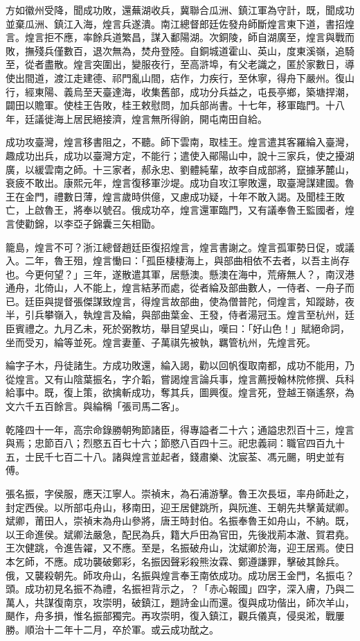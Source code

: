 \begin{pinyinscope}
方如徽州受降，聞成功敗，還蕪湖收兵，冀聯合瓜洲、鎮江軍為守計，既，聞成功並棄瓜洲、鎮江入海，煌言兵遂潰。南江總督郎廷佐發舟師斷煌言東下道，書招煌言。煌言拒不應，率餘兵道繁昌，謀入鄱陽湖。次銅陵，師自湖廣至，煌言與戰而敗，撫殘兵僅數百，退次無為，焚舟登陸。自銅城道霍山、英山，度東溪嶺，追騎至，從者盡散。煌言突圍出，變服夜行，至高滸埠，有父老識之，匿於家數日，導使出間道，渡江走建德、祁門亂山間，痁作，力疾行，至休寧，得舟下嚴州。復山行，經東陽、義烏至天臺達海，收集舊部，成功分兵益之，屯長亭鄉，築塘捍潮，闢田以贍軍。使桂王告敗，桂王敕慰問，加兵部尚書。十七年，移軍臨門。十八年，廷議徙海上居民絕接濟，煌言無所得餉，開屯南田自給。

成功攻臺灣，煌言移書阻之，不聽。師下雲南，取桂王。煌言遣其客羅綸入臺灣，趣成功出兵，成功以臺灣方定，不能行；遣使入鄖陽山中，說十三家兵，使之擾湖廣，以緩雲南之師。十三家者，郝永忠、劉體純輩，故李自成部將，竄據茅麓山，衰疲不敢出。康熙元年，煌言復移軍沙堤。成功自攻江寧敗還，取臺灣謀建國。魯王在金門，禮數日薄，煌言歲時供億，又慮成功疑，十年不敢入謁。及聞桂王敗亡，上啟魯王，將奉以號召。俄成功卒，煌言還軍臨門，又有議奉魯王監國者，煌言使勸錦，以李亞子錦囊三矢相勖。

籠島，煌言不可？浙江總督趙廷臣復招煌言，煌言書謝之。煌言孤軍勢日促，或議入。二年，魯王殂，煌言慟曰：「孤臣棲棲海上，與部曲相依不去者，以吾主尚存也。今更何望？」三年，遂散遣其軍，居懸澳。懸澳在海中，荒瘠無人？，南汊港通舟，北倚山，人不能上，煌言結茅而處，從者綸及部曲數人，一侍者、一舟子而已。廷臣與提督張傑謀致煌言，得煌言故部曲，使為僧普陀，伺煌言，知蹤跡，夜半，引兵攀嶺入，執煌言及綸，與部曲葉金、王發，侍者湯冠玉。煌言至杭州，廷臣賓禮之。九月乙未，死於弼教坊，舉目望吳山，嘆曰：「好山色！」賦絕命詞，坐而受刃，綸等並死。煌言妻董、子萬祺先被執，羈管杭州，先煌言死。

綸字子木，丹徒諸生。方成功敗還，綸入謁，勸以回帆復取南都，成功不能用，乃從煌言。又有山陰葉振名，字介韜，嘗謁煌言論兵事，煌言薦授翰林院修撰、兵科給事中。既，復上策，欲擒斬成功，奪其兵，圖興復。煌言死，登越王嶺遙祭，為文六千五百餘言。與綸稱「張司馬二客」。

乾隆四十一年，高宗命錄勝朝殉節諸臣，得專謚者二十六；通謚忠烈百十三，煌言與焉；忠節百八；烈愍五百七十六；節愍八百四十三。祀忠義祠：職官四百九十五，士民千七百二十八。諸與煌言並起者，錢肅樂、沈宸荃、馮元颺，明史並有傅。

張名振，字侯服，應天江寧人。崇禎末，為石浦游擊。魯王次長垣，率舟師赴之，封定西侯。以所部屯舟山，移南田，迎王居健跳所，與阮進、王朝先共擊黃斌卿。斌卿，莆田人，崇禎末為舟山參將，唐王時封伯。名振奉魯王如舟山，不納。既，以王命進侯。斌卿法嚴急，配民為兵，籍大戶田為官田，先後戕荊本澈、賀君堯。王次健跳，令進告糴，又不應。至是，名振破舟山，沈斌卿於海，迎王居焉。使日本乞師，不應。成功襲破鄭彩，名振因聲彩殺熊汝霖、鄭遵謙罪，擊破其餘兵。俄，又襲殺朝先。師攻舟山，名振與煌言奉王南依成功。成功居王金門，名振屯？頭。成功初見名振不為禮，名振袒背示之，？「赤心報國」四字，深入膚，乃與二萬人，共謀復南京，攻崇明，破鎮江，題詩金山而還。復與成功偕出，師次羊山，颶作，舟多損，惟名振部獨完。再攻崇明，復入鎮江，觀兵儀真，侵吳淞，戰屢勝。順治十二年十二月，卒於軍。或云成功酖之。


\end{pinyinscope}
